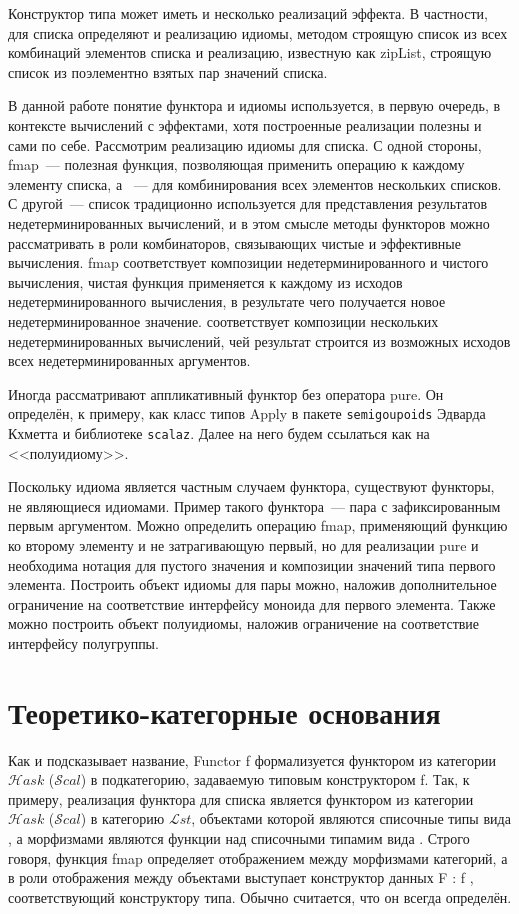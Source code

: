 Конструктор типа может иметь и несколько реализаций эффекта. В частности, для списка определяют и реализацию идиомы, методом \<\circledast\> строящую список из всех комбинаций элементов списка и реализацию, известную как \<zipList\>, строящую список из поэлементно взятых пар значений списка.

В данной работе понятие функтора и идиомы используется, в первую очередь, в контексте вычислений с эффектами, хотя построенные реализации полезны и сами по себе. Рассмотрим реализацию идиомы для списка. С одной стороны, \<fmap\>~--- полезная функция, позволяющая применить операцию к каждому элементу списка, а \<\circledast\>~--- для комбинирования всех элементов нескольких списков. С другой~--- список традиционно используется для представления результатов недетерминированных вычислений, и в этом смысле методы функторов можно рассматривать в роли комбинаторов, связывающих чистые и эффективные вычисления. \<fmap\> соответствует композиции недетерминированного и чистого вычисления, чистая функция применяется к каждому из исходов недетерминированного вычисления, в результате чего получается новое недетерминированное значение. \<\circledast\> соответствует композиции нескольких недетерминированных вычислений, чей результат строится из возможных исходов всех недетерминированных аргументов.

Иногда рассматривают аппликативный функтор без оператора \<pure\>. Он определён, к примеру, как класс типов \<Apply\> в пакете \texttt{semigoupoids} Эдварда Кхметта и библиотеке \texttt{scalaz}. Далее на него будем ссылаться как на <<полуидиому>>.

Поскольку идиома является частным случаем функтора, существуют функторы, не являющиеся идиомами. Пример такого функтора~--- пара с зафиксированным первым аргументом. Можно определить операцию \<fmap\>, применяющий функцию ко второму элементу и не затрагивающую первый, но для реализации \<pure\> и \<\circledast\> необходима нотация для пустого значения и композиции значений типа первого элемента. Построить объект идиомы для пары можно, наложив дополнительное ограничение на соответствие интерфейсу моноида для первого элемента. Также можно построить объект полуидиомы, наложив ограничение на соответствие интерфейсу полугруппы.

\section{Теоретико-категорные основания}
Как и подсказывает название, \<Functor f\> формализуется функтором из категории $\mathcal{H}ask$ ($\mathcal{S}cal$) в подкатегорию, задаваемую типовым конструктором \<f\>. Так, к примеру, реализация функтора для списка является функтором из категории $\mathcal{H}ask$ ($\mathcal{S}cal$) в категорию $\mathcal{L}st$, объектами которой являются списочные типы вида \<[\alpha]\>, а морфизмами являются функции над списочными типамим вида \<[\alpha] \to [\beta]\>. Строго говоря, функция \<fmap\> определяет отображением между морфизмами категорий, а в роли отображения между объектами выступает конструктор данных \<F : f \alpha\>, соответствующий конструктору типа. Обычно считается, что он всегда определён.

